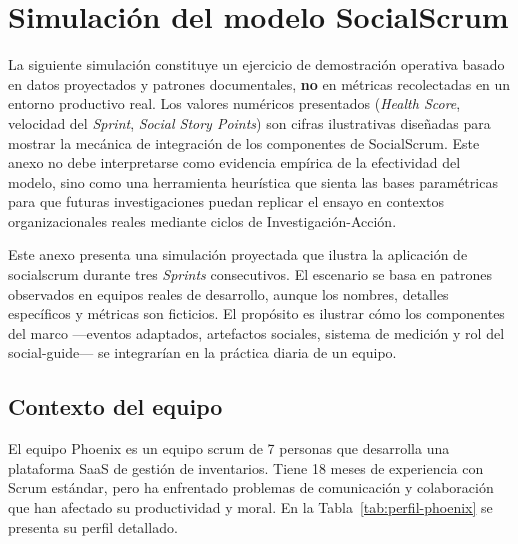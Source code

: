 \chapter{Simulación del modelo SocialScrum}
\label{anexo:simulacion-socialscrum}

\begin{tcolorbox}[colback=gray!10, colframe=black, fonttitle=\bfseries, title=Nota metodológica importante, breakable]
    La siguiente simulación constituye un ejercicio de demostración operativa basado en datos proyectados y patrones documentales, \textbf{no} en métricas recolectadas en un entorno productivo real. Los valores numéricos presentados (\textit{Health Score}, velocidad del \textit{Sprint}, \textit{Social Story Points}) son cifras ilustrativas diseñadas para mostrar la mecánica de integración de los componentes de SocialScrum. Este anexo no debe interpretarse como evidencia empírica de la efectividad del modelo, sino como una herramienta heurística que sienta las bases paramétricas para que futuras investigaciones puedan replicar el ensayo en contextos organizacionales reales mediante ciclos de Investigación-Acción.
\end{tcolorbox}

Este anexo presenta una simulación proyectada que ilustra la aplicación de \gls{socialscrum} durante tres \textit{Sprints} consecutivos. El escenario se basa en patrones observados en equipos reales de desarrollo, aunque los nombres, detalles específicos y métricas son ficticios. El propósito es ilustrar cómo los componentes del marco ---eventos adaptados, artefactos sociales, sistema de medición y rol del \gls{social-guide}--- se integrarían en la práctica diaria de un equipo.

\section{Contexto del equipo}
El equipo Phoenix es un equipo \gls{scrum} de 7 personas que desarrolla una plataforma SaaS de gestión de inventarios. Tiene 18 meses de experiencia con Scrum estándar, pero ha enfrentado problemas de comunicación y colaboración que han afectado su productividad y moral. En la Tabla~\ref{tab:perfil-phoenix} se presenta su perfil detallado.

\begingroup
\scriptsize
\renewcommand{\arraystretch}{1.4}
\setlength{\LTleft}{0pt}
\setlength{\LTright}{0pt}

